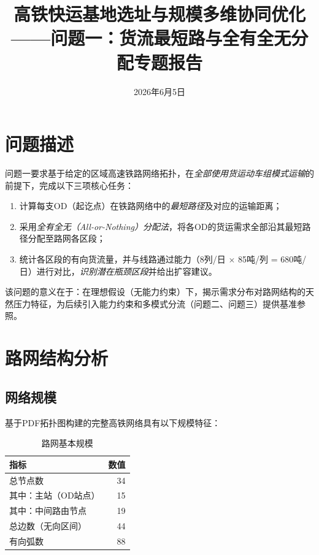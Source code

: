 \documentclass[12pt,a4paper,fontset=none]{ctexart}
\begin{document}
\title{\heiti{} 高铁快运基地选址与规模多维协同优化\\[6pt]
       \large ——问题一：货流最短路与全有全无分配专题报告}
\author{}
\date{ 2026年6月5日}
\maketitle
\thispagestyle{empty}

\section{问题描述}

问题一要求基于给定的区域高速铁路网络拓扑，在\emph{全部使用货运动车组模式运输}的前提下，完成以下三项核心任务：

\begin{enumerate}[leftmargin=*]
    \item 计算每支OD（起讫点）在铁路网络中的\emph{最短路径}及对应的运输距离；
    \item 采用\emph{全有全无（All-or-Nothing）分配法}，将各OD的货运需求全部沿其最短路径分配至路网各区段；
    \item 统计各区段的有向货流量，并与线路通过能力（8列/日 $\times$ 85吨/列 = 680吨/日）进行对比，\emph{识别潜在瓶颈区段}并给出扩容建议。
\end{enumerate}

该问题的意义在于：在理想假设（无能力约束）下，揭示需求分布对路网结构的天然压力特征，为后续引入能力约束和多模式分流（问题二、问题三）提供基准参照。

\section{路网结构分析}

\subsection{网络规模}

基于PDF拓扑图构建的完整高铁网络具有以下规模特征：

\begin{table}[H]
\centering
\caption{路网基本规模}
\begin{tabular}{lr}
\toprule
\textbf{指标} & \textbf{数值} \\
\midrule
总节点数 & 34 \\
\quad 其中：主站（OD站点）& 15 \\
\quad 其中：中间路由节点 & 19 \\
总边数（无向区间）& 44 \\
有向弧数 & 88 \\
\bottomrule
\end{tabular}
\end{table}
\end{document}
